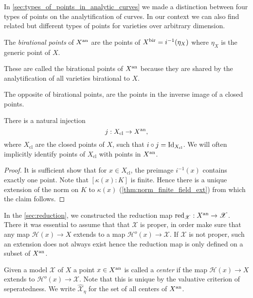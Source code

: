 In \cref{sec:types_of_points_in_analytic_curves} we made a distinction between four types of points on the analytification of curves. 
In our context we can also find related but different types of points for varieties over arbitrary dimension. 

\begin{definition}
	The \emph{birational points} of $X{}^{\text{an}}$ are the points of $X{}^{\text{bir}} = i ^{-1}(\eta_X)$ where $\eta_X$ is the generic point of $X$. 
\end{definition}
These are called the birational points of $X{}^{\text{an}}$ because they are shared by the analytification of all varieties birational to $X$.

The opposite of birational points, are the points in the inverse image of a closed points. 
\begin{lemma}
	There is a natural injection \[
		j: X_\text{cl}  \to X{}^{\text{an}} 
	,\] 
	where $X_\text{cl} $ are the closed points of $X$, such that $i \circ j = \operatorname{Id} _{X_\text{cl} }$. 
	We will often implicitly identify points of $X_\text{cl} $ with points in $X{}^{\text{an}}$. 
\end{lemma}
\begin{proof}
	It is sufficient show that for $x \in X_\text{cl} $, the preimage $i^{-1}(x)$ contains exactly one point. 
	Note that $[\kappa(x):K]$ is finite. 
	Hence there is a unique extension of the norm on $K$ to $\kappa(x)$ (\cref{thm:norm_finite_field_ext}) from which the claim follows. 
\end{proof}

In the \cref{sec:reduction}, we constructed the reduction map $\operatorname{red}_{\mathscr X}: X{}^{\text{an}} \to \mathscr X$. 
There it was essential to assume that that $\mathscr X$ is proper, in order make sure that any map $\mathcal{H} (x) \to X$ extends to a map $\mathcal{H} ^{o}(x) \to \mathscr X$. 
If $\mathscr X$ is not proper, such an extension does not always exist hence the reduction map is only defined on a subset of $X{}^{\text{an}}$. 
\begin{definition}
	Given a model $\mathscr X$ of $X$ a point $x \in X{}^{\text{an}} $ is called a \emph{center} if the map $\mathcal{H} (x) \to X$ extends to $\mathcal{H}^{o} (x) \to \mathscr X$. 
	Note that this is unique by the valuative criterion of seperatedness. 
	We write $\widehat{\mathscr X}_\eta$ for the set of all centers of $X{}^{\text{an}}$. 
\end{definition}

